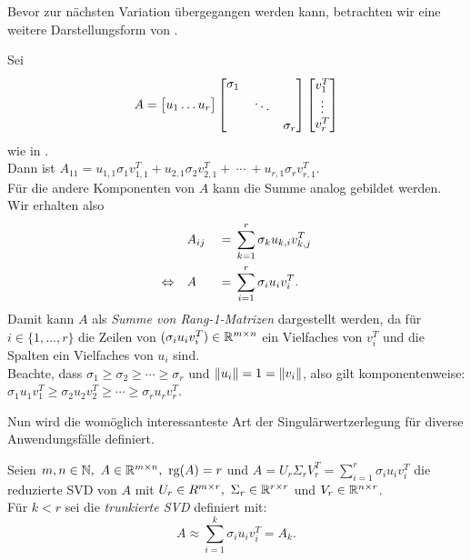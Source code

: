 Bevor zur nächsten Variation übergegangen werden kann, betrachten wir eine weitere Darstellungsform von .
\begin{remark}\label{rem:onesvd}
    Sei
    \begin{equation*}
        A = 
        \big[
            \begin{matrix}
                u_1 \dots u_{r}
            \end{matrix}
        \big]
        \begin{bmatrix}
            \sigma_1 &  & \\
            &  \rotatebox{12}{\(\ddots\)} &  \\
            &  &  \sigma_r \\
        \end{bmatrix}
        \begin{bmatrix}
            v^{T}_1 \\
            \vdots \\
            v^{T}_r \\
        \end{bmatrix}
    \end{equation*}
    wie in . \\
    Dann ist \(A_{11} = u_{1,1} \sigma_1 v^{T}_{1,1} + u_{2,1} \sigma_2 v^{T}_{2,1} +\ \cdots \ + u_{r,1} \sigma_r v^{T}_{r,1} \). \\
    Für die andere Komponenten von \(A\) kann die Summe analog gebildet werden. 
    Wir erhalten also
    \begin{alignat*}{2}
        &A_{ij} &{}={}& \sum_{k=1}^{r} \sigma_k u_{k,i} v^{T}_{k,j}  \\
        \Leftrightarrow \quad &A &{}={}& \sum_{i=1}^{r} \sigma_i u_i v^{T}_i.
    \end{alignat*}
    Damit kann \(A\) als \textit{Summe von Rang-\num{1}-Matrizen} dargestellt werden, da für \(i \in \{1,\ldots,r\}\) die Zeilen von \((\sigma_i u_i v^{T}_i)\in \mathbb{R}^{m \times n}\) ein Vielfaches von \(v^{T}_i\) und die Spalten ein Vielfaches von \(u_i\) sind. \\
    Beachte, dass \(\sigma_1 \geq \sigma_2 \geq \cdots \geq \sigma_r\) und \(\lVert u_i\rVert=1=\lVert v_i\rVert\), also gilt komponentenweise: \(\sigma_1 u_1 v^{T}_1 \geq \sigma_2 u_2 v^{T}_2 \geq \cdots \geq \sigma_r u_r v^{T}_r\). 
\end{remark}
Nun wird die womöglich interessanteste Art der Singulärwertzerlegung für diverse Anwendungsfälle definiert.
\begin{definition}\label{df:trunsvd}
    Seien \(m,n \in \N,\ A \in \R^{m \times n},\ \text{rg}(A)=r\) und \(A=U_r \Sigma_r V^{T}_r = \sum_{i=1}^{r} \sigma_i u_i v^{T}_i\) die reduzierte SVD von \(A\) mit \(U_r \in R^{m \times r},\ \Sigma_r \in \mathbb{R}^{r \times r}\) und \(V_r \in \mathbb{R}^{n \times r}\). \\
    Für \(k < r\) sei die \textit{trunkierte SVD} definiert mit:
    \begin{equation*}
        A \approx \sum_{i=1}^{k} \sigma_i u_i v^{T}_i = A_k.
    \end{equation*}
\end{definition}
